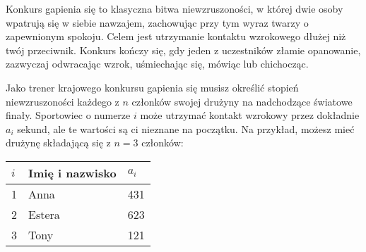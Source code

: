 

\noindent
Konkurs gapienia się to klasyczna bitwa niewzruszoności, w której dwie osoby wpatrują się w siebie nawzajem, zachowując przy tym wyraz twarzy o zapewnionym spokoju.
Celem jest utrzymanie kontaktu wzrokowego dłużej niż twój przeciwnik.
Konkurs kończy się, gdy jeden z uczestników złamie opanowanie, zazwyczaj odwracając wzrok, uśmiechając się, mówiąc lub chichocząc.

Jako trener krajowego konkursu gapienia się musisz określić stopień niewzruszoności każdego z $n$ członków swojej drużyny na nadchodzące światowe finały.
Sportowiec o numerze $i$ może utrzymać kontakt wzrokowy przez dokładnie $a_i$ sekund, ale te wartości są ci nieznane na początku.
Na przykład, możesz mieć drużynę składającą się z $n=3$ członków:

\medskip
\begin{tabular}{lll}
  $i$ & Imię i nazwisko & $a_i$\\\hline
 1 & Anna & 431 \\ %
 2 & Estera & 623 \\
 3 & Tony & 121\\
\end{tabular}

